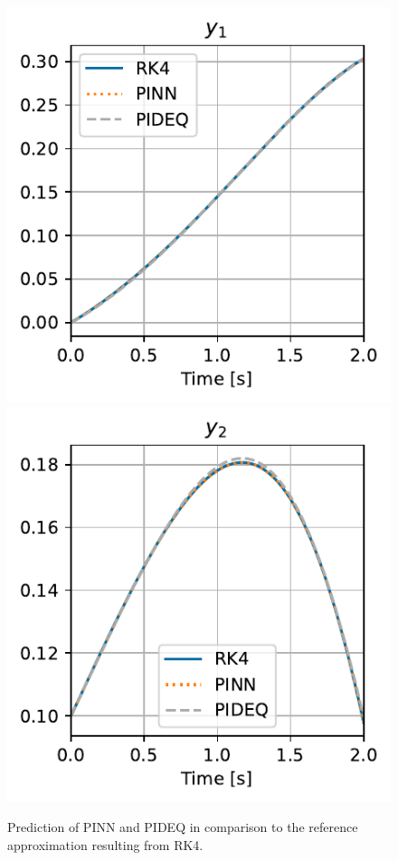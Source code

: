 \documentclass[t]{beamer}
\begin{document}
\begin{frame}
    \begin{figure}[h]
	\vspace{.1\textheight}
	\centering
	\includegraphics[width=.45\textwidth]{../images/final_vdp_y1.pdf}
	\includegraphics[width=.45\textwidth]{../images/final_vdp_y2.pdf}
	\caption{Prediction of PINN and PIDEQ in comparison to the reference approximation resulting from RK4.}
	\label{fig:final-vdp}
    \end{figure}
\end{frame}
\end{document}
